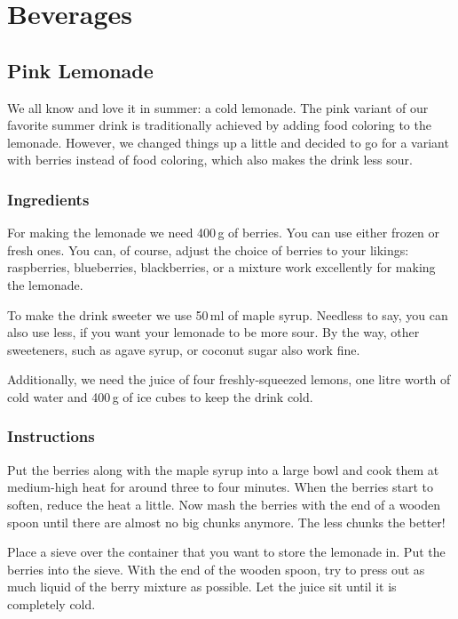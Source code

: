 	
% 
	
\section{Beverages}
	
\subsection{Pink Lemonade}
We all know and love it in summer: a cold lemonade. The pink variant of our  favorite summer drink is traditionally achieved by adding food coloring to the lemonade. 
However, we changed things up a little and decided to go for a variant with berries instead of food coloring, which also makes the drink less sour.
	
\subsubsection{Ingredients}
For making the lemonade we need 400\,g of berries. You can use either frozen or fresh ones. You can, of course, adjust the choice of berries to your likings: raspberries, blueberries, blackberries, or a mixture work excellently for making the lemonade.

To make the drink sweeter we use 50\,ml of maple syrup. Needless to say, you can also use less, if you want your lemonade to be more sour. By the way, other sweeteners, such as agave syrup, or coconut sugar also work fine.

Additionally, we need the juice of four freshly-squeezed lemons, one litre worth of cold water and 400\,g of ice cubes to keep the drink cold.
	
\subsubsection{Instructions}
Put the berries along with the maple syrup into a large bowl and cook them at medium-high heat for around three to four minutes. When the berries start to soften, reduce the heat a little. Now mash the berries with the end of a wooden spoon until there are almost no big chunks anymore. The less chunks the better!
	
Place a sieve over the container that you want to store the lemonade in. Put the berries into the sieve. With the end of the wooden spoon, try to press out as much liquid of the berry mixture as possible. Let the juice sit until it is completely cold.
	
